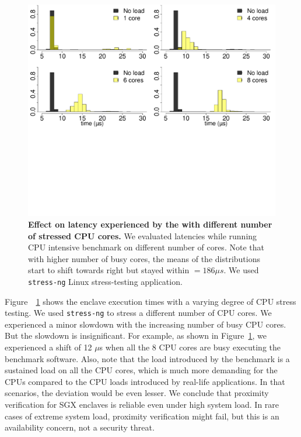 \begin{figure}[t]
  \centering
    \includegraphics[trim={0 12cm 0 0}, clip, width=\linewidth]{chapters/ProximiTEE/data/CPU_stress/allCore_SGX_1.pdf}
    \caption[Effect on latency experienced by the \device with different number of stressed CPU cores]{\textbf{Effect on latency experienced by the \device with different number of stressed CPU cores.} We evaluated latencies while running CPU intensive benchmark on different number of cores. Note that with higher number of busy cores, the means of the  distributions start to shift towards right but stayed within \connect $= 186\mu s$. We used \texttt{stress-ng} Linux stress-testing application.}
    \label{graph:cpuLoad_SGX}
\end{figure}


 Figure~~\ref{graph:cpuLoad_SGX} shows the enclave execution times with a varying degree of CPU stress testing. We used \texttt{stress-ng} to stress a different number of CPU cores. We experienced a minor slowdown with the increasing number of busy CPU cores. But the slowdown is insignificant. For example, as shown in Figure~\ref{graph:cpuLoad_SGX}, we experienced a shift of 12 $\mu$s when all the 8 CPU cores are busy executing the benchmark software. Also, note that the load introduced by the benchmark is a sustained load on all the CPU cores, which is much more demanding for the CPUs compared to the CPU loads introduced by real-life applications. In that scenarios, the deviation would be even lesser. We conclude that proximity verification for SGX enclaves is reliable even under high system load. In rare cases of extreme system load, proximity verification might fail, but this is an availability concern, not a security threat.


